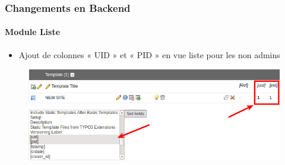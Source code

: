 
\begin{frame}[fragile]
	\frametitle{Changements en Backend}
	\framesubtitle{Module Liste}

	\begin{itemize}
		\item Ajout de colonnes « UID » et « PID » en vue liste pour les non admins
	\end{itemize}

	\begin{figure}
		\includegraphics[width=0.95\linewidth]{Images/BackendChanges/AdditionalColumnsInListModule.png}
	\end{figure}

\end{frame}


